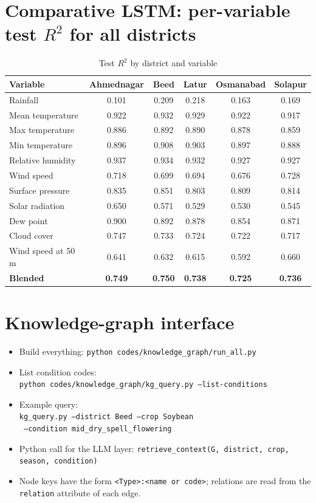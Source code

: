 \section{Comparative LSTM: per-variable test $R^2$ for all districts}
\begin{table}[H]
	\centering
	\caption{Test $R^2$ by district and variable}
	\small
	\begin{tabular}{lccccc}
		\toprule
		\textbf{Variable} & \textbf{Ahmednagar} & \textbf{Beed} & \textbf{Latur} & \textbf{Osmanabad} & \textbf{Solapur} \\
		\midrule
		Rainfall & 0.101 & 0.209 & 0.218 & 0.163 & 0.169 \\
		Mean temperature & 0.922 & 0.932 & 0.929 & 0.922 & 0.917 \\
		Max temperature & 0.886 & 0.892 & 0.890 & 0.878 & 0.859 \\
		Min temperature & 0.896 & 0.908 & 0.903 & 0.897 & 0.888 \\
		Relative humidity & 0.937 & 0.934 & 0.932 & 0.927 & 0.927 \\
		Wind speed & 0.718 & 0.699 & 0.694 & 0.676 & 0.728 \\
		Surface pressure & 0.835 & 0.851 & 0.803 & 0.809 & 0.814 \\
		Solar radiation & 0.650 & 0.571 & 0.529 & 0.530 & 0.545 \\
		Dew point & 0.900 & 0.892 & 0.878 & 0.854 & 0.871 \\
		Cloud cover & 0.747 & 0.733 & 0.724 & 0.722 & 0.717 \\
		Wind speed at 50 m & 0.641 & 0.632 & 0.615 & 0.592 & 0.660 \\
		\midrule
		\textbf{Blended} & \textbf{0.749} & \textbf{0.750} & \textbf{0.738} & \textbf{0.725} & \textbf{0.736} \\
		\bottomrule
	\end{tabular}
\end{table}

\section{Knowledge-graph interface}
\begin{itemize}
	\item Build everything: \texttt{python codes/knowledge\_graph/run\_all.py}
	\item List condition codes:\\ \texttt{python codes/knowledge\_graph/kg\_query.py --list-conditions}
	\item Example query:\\ \texttt{kg\_query.py --district Beed --crop Soybean}\\ \texttt{\phantom{kg\_query.py} --condition mid\_dry\_spell\_flowering}
	\item Python call for the LLM layer: \texttt{retrieve\_context(G, district, crop, season, condition)}
	\item Node keys have the form \texttt{<Type>:<name or code>}; relations are read from the \texttt{relation} attribute of each edge.
\end{itemize}

